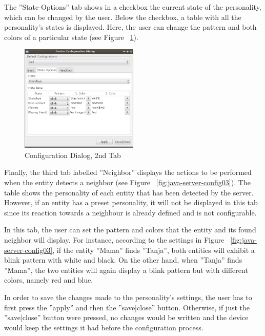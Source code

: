 The ''State-Options'' tab shows in a checkbox the current state of the personality, which can be changed by the user. Below the checkbox, a table with all the personality's states is displayed. Here, the user can change the pattern and both colors of a particular state (see Figure ~\ref{fig:java-server-config02}). 


\begin{figure}[h!]
 \centering
 \includegraphics[width= 0.5\textwidth, clip=true  ,keepaspectratio=true]{./pic/java-server-config02.png}
 \caption{Configuration Dialog, 2nd Tab}
 \label{fig:java-server-config02}
\end{figure}


Finally, the third tab labelled ''Neighbor'' displays the actions to be performed when the entity detects a neighbor (see Figure ~\ref{fig:java-server-config03}). The table shows the personality of each entity that has been detected by the server. However, if an entity has a preset personality, it will not be displayed in this tab since its reaction towards a neighbour is already defined and is not configurable. 

In this tab, the user can set the pattern and colors that the entity and its found neighbor will display. For instance, according to the settings in Figure ~\ref{fig:java-server-config03}, if the entity ''Mama'' finds ''Tanja'', both entities will exhibit a blink pattern with white and black. On the other hand, when ''Tanja'' finds ''Mama'', the two entities will again display a blink pattern but with different colors, namely red and blue. 

In order to save the changes made to the personality's settings, the user has to first press the ''apply'' and then the ''save|close'' button. Otherwise, if just the ''save|close'' button were pressed, no changes would be written and the device would keep the settings it had before the configuration process.

